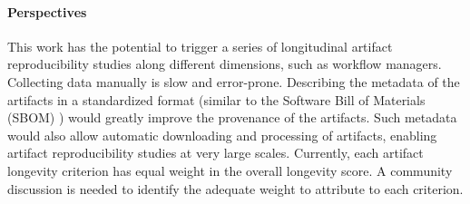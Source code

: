 \documentclass[sigconf,natbib=false]{acmart}
\newcommand{\eg}{\emph{e.g.,}}
\newcommand{\aeval}{AE}
\newcommand{\todo}[1]{{\color{red}{TODO: #1}}}
\begin{document}
\paragraph{Perspectives}

This work has the potential to trigger a series of longitudinal artifact reproducibility studies along different dimensions, such as workflow managers.
Collecting data manually is slow and error-prone.
Describing the metadata of the artifacts in a standardized format (similar to the Software Bill of Materials (SBOM) \cite{sbom, xia2023empirical}) would greatly improve the provenance of the artifacts.
Such metadata would also allow automatic downloading and processing of artifacts, enabling artifact reproducibility studies at very large scales.
Currently, each artifact longevity criterion has equal weight in the overall longevity score. 
A community discussion is needed to identify the adequate weight to attribute to each criterion. 

% 
% 
% 
% 
\end{document}
